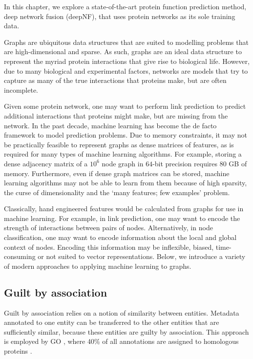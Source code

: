 In this chapter, we explore a state-of-the-art protein function prediction method, deep network fusion (deepNF), that uses protein networks as its sole training data.

Graphs are ubiquitous data structures that are suited to modelling problems that are high-dimensional and sparse.
As such, graphs are an ideal data structure to represent the myriad protein interactions that give rise to biological life.
However, due to many biological and experimental factors, networks are models that try to capture as many of the true interactions that proteins make, but are often incomplete.

Given some protein network, one may want to perform link prediction to predict additional interactions that proteins might make, but are missing from the network.
In the past decade, machine learning has become the de facto framework to model prediction problems.
Due to memory constraints, it may not be practically feasible to represent graphs as dense matrices of features, as is required for many types of machine learning algorithms.
For example, storing a dense adjacency matrix of a $10^6$ node graph in $64$-bit precision requires $80$ GB of memory.
Furthermore, even if dense graph matrices can be stored, machine learning algorithms may not be able to learn from them because of high sparsity, the curse of dimensionality and the `many features; few examples' problem.

Classically, hand engineered features would be calculated from graphs for use in machine learning.
For example, in link prediction, one may want to encode the strength of interactions between pairs of nodes.
Alternatively, in node classification, one may want to encode information about the local and global context of nodes.
Encoding this information may be inflexible, biased, time-consuming or not suited to vector representations.
Below, we introduce a variety of modern approaches to applying machine learning to graphs.

\subsection{Guilt by association}

Guilt by association relies on a notion of similarity between entities.
Metadata annotated to one entity can be transferred to the other entities that are sufficiently similar, because these entities are guilty by association.
This approach is employed by GO \cite{Ashburner2000}, where 40\% of all annotations are assigned to homologous proteins \cite{Peled2016}.

